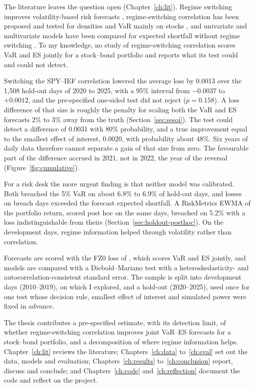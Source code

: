 The literature leaves the question open (Chapter~\ref{ch:lit}). Regime switching improves volatility-based risk forecasts \citep{ardia2018}, regime-switching correlation has been proposed \citep{pelletier2006} and tested for densities and VaR mainly on stocks \citep{paolella2019}, and univariate and multivariate models have been compared for expected shortfall without regime switching \citep{fortin2023}. To my knowledge, no study of regime-switching correlation scores VaR and ES jointly for a stock--bond portfolio and reports what its test could and could not detect.

Switching the SPY--IEF correlation lowered the average loss by 0.0013 over the 1,508 hold-out days of 2020 to 2025, with a 95\% interval from $-0.0037$ to $+0.0012$, and the pre-specified one-sided test did not reject ($p=0.158$). A loss difference of that size is roughly the penalty for scaling both the VaR and ES forecasts 2\% to 3\% away from the truth (Section~\ref{sec:sesoi}). The test could detect a difference of 0.0031 with 80\% probability, and a true improvement equal to the smallest effect of interest, 0.0020, with probability about 48\%. Six years of daily data therefore cannot separate a gain of that size from zero. The favourable part of the difference accrued in 2021, not in 2022, the year of the reversal (Figure~\ref{fig:cumulative}).

For a risk desk the more urgent finding is that neither model was calibrated. Both breached the 5\% VaR on about 6.8\% to 6.9\% of hold-out days, and losses on breach days exceeded the forecast expected shortfall. A RiskMetrics EWMA of the portfolio return, scored post hoc on the same days, breached on 5.2\% with a loss indistinguishable from theirs (Section~\ref{sec:holdout-posthoc}). On the development days, regime information helped through volatility rather than correlation.

Forecasts are scored with the FZ0 loss of \citet{patton2019}, which scores VaR and ES jointly, and models are compared with a Diebold--Mariano test with a heteroskedasticity- and autocorrelation-consistent standard error. The sample is split into development days (2010--2019), on which I explored, and a hold-out (2020--2025), used once for one test whose decision rule, smallest effect of interest and simulated power were fixed in advance.

The thesis contributes a pre-specified estimate, with its detection limit, of whether regime-switching correlation improves joint VaR--ES forecasts for a stock--bond portfolio, and a decomposition of where regime information helps. Chapter~\ref{ch:lit} reviews the literature; Chapters~\ref{ch:data} to~\ref{ch:eval} set out the data, models and evaluation; Chapters~\ref{ch:results} to~\ref{ch:conclusion} report, discuss and conclude; and Chapters~\ref{ch:code} and~\ref{ch:reflection} document the code and reflect on the project.
